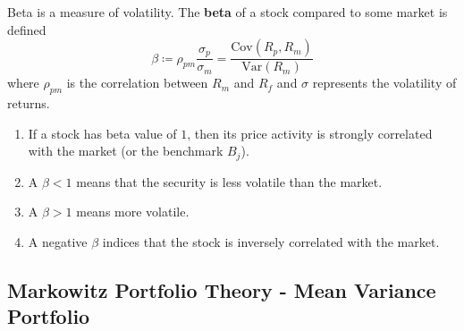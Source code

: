\documentclass{article}
\begin{document}
  \begin{definition}[Beta]
    \label{def:beta}
    Beta is a measure of volatility. The \textbf{beta} of a stock compared to some market is defined 
    \begin{equation}
      \beta \coloneqq \rho_{pm} \frac{\sigma_p}{\sigma_m} = \frac{\mathrm{Cov}(R_p, R_m)}{\mathrm{Var}(R_m)}
    \end{equation}
    where $\rho_{pm}$ is the correlation between $R_m$ and $R_f$ and $\sigma$ represents the volatility of returns. 
    \begin{enumerate}
      \item If a stock has beta value of $1$, then its price activity is strongly correlated with the market (or the benchmark $B_j$). 
      \item A $\beta < 1$ means that the security is less volatile than the market. 
      \item A $\beta > 1$ means more volatile. 
      \item A negative $\beta$ indices that the stock is inversely correlated with the market. 
    \end{enumerate}
  \end{definition}

  \subsection{Markowitz Portfolio Theory - Mean Variance Portfolio}
    
\end{document}
